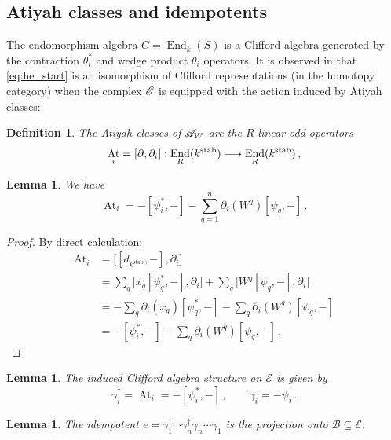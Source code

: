 \documentclass[english,letter paper,12pt,leqno]{article}
\newtheorem{lemma}[theorem]{Lemma}
\theoremstyle{example}
\newtheorem{definition}[theorem]{Definition}
\numberwithin{equation}{section}
\def\stab{\operatorname{stab}}
\DeclareMathOperator{\End}{End}
\DeclareMathOperator{\At}{At}
\begin{document}
\subsection{Atiyah classes and idempotents}

The endomorphism algebra $C = \End_k(S)$ is a Clifford algebra generated by the contraction $\theta_i^*$ and wedge product $\theta_i$ operators. It is observed in \cite{murfet} that \eqref{eq:he_start} is an isomorphism of Clifford representations (in the homotopy category) when the complex $\mathscr{E}$ is equipped with the action induced by Atiyah classes:

\begin{definition}
The Atiyah classes of $\mathscr{A}_W$ are the $R$-linear odd operators
\[
\At_i = [\partial, \partial_{i}]: \End_R(k^{\stab}) \lto \End_R(k^{\stab})\,,
\]
\end{definition}

\begin{lemma} We have
\[
\At_i = -[\psi_i^*, -] - \sum_{q=1}^n \partial_{i}(W^q) [ \psi_q, - ]\,.
\]
\end{lemma}
\begin{proof}
By direct calculation:
\begin{align*}
\At_i &= \big[ [d_{k^{\stab}},-], \partial_{i} \big]\\
&= \sum_q \big[x_q [\psi_q^*,-], \partial_{i}\big] + \sum_q \big[W^q [\psi_q,-], \partial_{i}\big]\\
&= -\sum_q \partial_{i}(x_q) [\psi_q^*,-] - \sum_q \partial_{i}(W^q) [\psi_q,-]\\
&= -[\psi_i^*,-] - \sum_q \partial_{i}(W^q) [\psi_q, -]\,.
\end{align*}
\end{proof}

\begin{lemma} The induced Clifford algebra structure on $\mathscr{E}$ is given by
\[
\gamma_i^\dagger = \At_i = -[\psi_i^*, -]\,, \qquad \gamma_i = -\psi_i\,.
\]
\end{lemma}

\begin{lemma} The idempotent $e = \gamma_1^\dagger \cdots \gamma_n^\dagger \gamma_n \cdots \gamma_1$ is the projection onto $\mathscr{B} \subseteq \mathscr{E}$.
\end{lemma}
\end{document}
